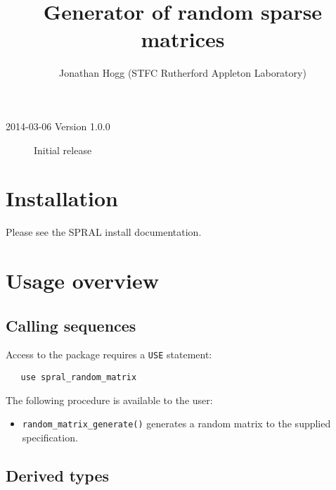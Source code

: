 
\title{Generator of random sparse matrices}
\author{Jonathan Hogg (STFC Rutherford Appleton Laboratory)}
\spralmaketitle
\thispagestyle{firststyle}

\versionhistory
\begin{description}
\item[2014-03-06 Version 1.0.0] Initial release
\end{description}


\section{Installation}
Please see the SPRAL install documentation.


\section{Usage overview}

\subsection{Calling sequences}

Access to the package requires a {\tt USE} statement:
\begin{verbatim}
   use spral_random_matrix
\end{verbatim}

\noindent
The following procedure is available to the user:
\begin{itemize}
   \item {\tt random\_matrix\_generate()} generates a random matrix to the
      supplied specification.
\end{itemize}


\subsection{Derived types} \label{derived types}

